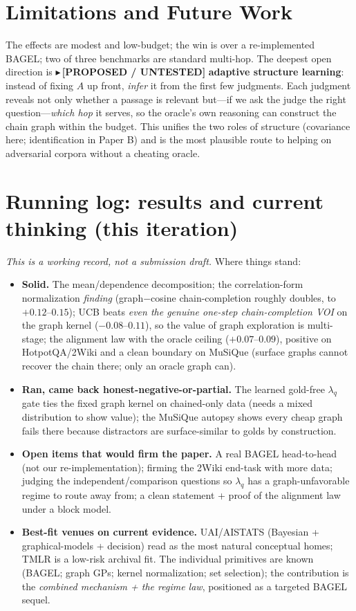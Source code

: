 \documentclass[11pt]{article}
\newcommand{\PROP}[1]{{\color{violet}\small$\blacktriangleright$\,\textbf{[PROPOSED / UNTESTED]} #1}}
\begin{document}
\section{Limitations and Future Work}\label{sec:future}
The effects are modest and low-budget; the win is over a re-implemented BAGEL; two of three benchmarks are
standard multi-hop. The deepest open direction is \PROP{\textbf{adaptive structure learning}: instead of fixing
$A$ up front, \emph{infer} it from the first few judgments. Each judgment reveals not only whether a passage is
relevant but---if we ask the judge the right question---\emph{which hop} it serves, so the oracle's own
reasoning can construct the chain graph within the budget. This unifies the two roles of structure (covariance
here; identification in Paper B) and is the most plausible route to helping on adversarial corpora without a
cheating oracle.}

\section*{Running log: results and current thinking (this iteration)}
\emph{This is a working record, not a submission draft.} Where things stand:
\begin{itemize}[leftmargin=*,itemsep=1pt]
  \item \textbf{Solid.} The mean/dependence decomposition; the correlation-form normalization \emph{finding}
  (graph$-$cosine chain-completion roughly doubles, to $+0.12$--$0.15$); UCB beats \emph{even the genuine
  one-step chain-completion VOI} on the graph kernel ($-0.08$--$0.11$), so the value of graph exploration is
  multi-stage; the alignment law with the oracle ceiling ($+0.07$--$0.09$), positive on HotpotQA/2Wiki and a
  clean boundary on MuSiQue (surface graphs cannot recover the chain there; only an oracle graph can).
  \item \textbf{Ran, came back honest-negative-or-partial.} The learned gold-free $\lambda_q$ gate ties the
  fixed graph kernel on chained-only data (needs a mixed distribution to show value); the MuSiQue autopsy shows
  every cheap graph fails there because distractors are surface-similar to golds by construction.
  \item \textbf{Open items that would firm the paper.} A real BAGEL head-to-head (not our re-implementation);
  firming the 2Wiki end-task with more data; judging the independent/comparison questions so $\lambda_q$ has a
  graph-unfavorable regime to route away from; a clean statement + proof of the alignment law under a block model.
  \item \textbf{Best-fit venues on current evidence.} UAI/AISTATS (Bayesian + graphical-models + decision) read
  as the most natural conceptual homes; TMLR is a low-risk archival fit. The individual primitives are known
  (BAGEL; graph GPs; kernel normalization; set selection); the contribution is the \emph{combined mechanism +
  the regime law}, positioned as a targeted BAGEL sequel.
\end{itemize}
\end{document}
